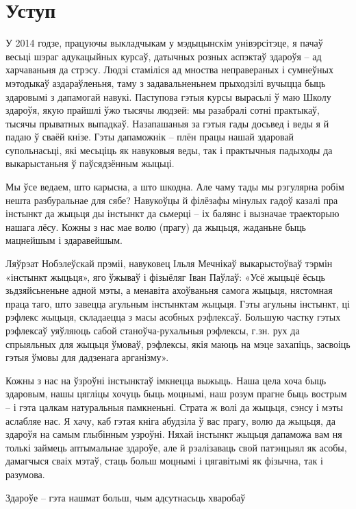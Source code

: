 \chapter*{Уступ}

У 2014 годзе, працуючы выкладчыкам у мэдыцынскім унівэрсітэце, я пачаў весьці шэраг адукацыйных курсаў, датычных розных аспэктаў здароўя – ад харчаваньня да стрэсу. Людзі стаміліся ад мноства неправераных і сумнеўных мэтодыкаў аздараўленьня, таму з задавальненьнем прыходзілі вучыцца быць здаровымі з дапамогай навукі. Паступова гэтыя курсы вырасьлі ў маю Школу здароўя, якую прайшлі ўжо тысячы людзей: мы разабралі сотні практыкаў, тысячы прыватных выпадкаў. Назапашаныя за гэтыя гады досьвед і веды я й падаю ў сваёй кнізе. Гэты дапаможнік – плён працы нашай здаровай супольнасьці, які месьціць як навуковыя веды, так і практычныя падыходы да выкарыстаньня ў паўсядзённым жыцьці.

Мы ўсе ведаем, што карысна, а што шкодна. Але чаму тады мы рэгулярна робім нешта разбуральнае для сябе? Навукоўцы й філёзафы мінулых гадоў казалі пра інстынкт да жыцьця ды інстынкт да сьмерці – іх балянс і вызначае траекторыю нашага лёсу. Кожны з нас мае волю (прагу) да жыцьця, жаданьне быць мацнейшым і здаравейшым.

Ляўрэат Нобэлеўскай прэміі, навуковец Ільля Мечнікаў выкарыстоўваў тэрмін «інстынкт жыцьця», яго ўжываў і фізыёляг Іван Паўлаў: «Усё жыцьцё ёсьць зьдзяйсьненьне адной мэты, а менавіта ахоўваньня самога жыцьця, нястомная праца таго, што завецца агульным інстынктам жыцьця. Гэты агульны інстынкт, ці рэфлекс жыцьця, складаецца з масы асобных рэфлексаў. Большую частку гэтых рэфлексаў уяўляюць сабой станоўча-рухальныя рэфлексы, г.зн. рух да спрыяльных для жыцьця ўмоваў, рэфлексы, якія маюць на мэце захапіць, засвоіць гэтыя ўмовы для дадзенага арганізму».

Кожны з нас на ўзроўні інстынктаў імкнецца выжыць. Наша цела хоча быць здаровым, нашы цягліцы хочуць быць моцнымі, наш розум прагне быць вострым – і гэта цалкам натуральныя памкненьні. Страта ж волі да жыцьця, сэнсу і мэты аслабляе нас. Я хачу, каб гэтая кніга абудзіла ў вас прагу, волю да жыцьця, да здароўя на самым глыбінным узроўні. Няхай інстынкт жыцьця дапаможа вам ня толькі займець аптымальнае здароўе, але й рэалізаваць свой патэнцыял як асобы, дамагчыся сваіх мэтаў, стаць больш моцнымі і цягавітымі як фізычна, так і разумова.


Здароўе – гэта нашмат больш, чым адсутнасьць хваробаў


